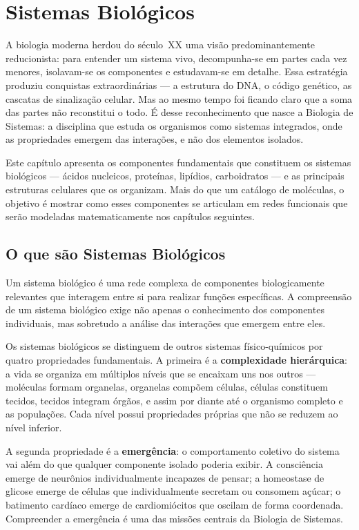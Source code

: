 \chapter{Sistemas Biológicos}
\label{cap:01}

A biologia moderna herdou do século~XX uma visão predominantemente reducionista: para entender
um sistema vivo, decompunha-se em partes cada vez menores, isolavam-se os componentes e
estudavam-se em detalhe. Essa estratégia produziu conquistas extraordinárias --- a estrutura
do DNA, o código genético, as cascatas de sinalização celular. Mas ao mesmo tempo foi ficando
claro que a soma das partes não reconstitui o todo. É desse reconhecimento que nasce a
Biologia de Sistemas: a disciplina que estuda os organismos como sistemas integrados, onde
as propriedades emergem das interações, e não dos elementos isolados.

Este capítulo apresenta os componentes fundamentais que constituem os sistemas biológicos
--- ácidos nucleicos, proteínas, lipídios, carboidratos --- e as principais estruturas
celulares que os organizam. Mais do que um catálogo de moléculas, o objetivo é mostrar
como esses componentes se articulam em redes funcionais que serão modeladas matematicamente
nos capítulos seguintes.

\section{O que são Sistemas Biológicos}

\begin{definicaoenv}
Um sistema biológico é uma rede complexa de componentes biologicamente relevantes que
interagem entre si para realizar funções específicas. A compreensão de um sistema biológico
exige não apenas o conhecimento dos componentes individuais, mas sobretudo a análise das
interações que emergem entre eles.
\end{definicaoenv}

Os sistemas biológicos se distinguem de outros sistemas físico-químicos por quatro
propriedades fundamentais. A primeira é a \textbf{complexidade hierárquica}: a vida se
organiza em múltiplos níveis que se encaixam uns nos outros --- moléculas formam organelas,
organelas compõem células, células constituem tecidos, tecidos integram órgãos, e assim
por diante até o organismo completo e as populações. Cada nível possui propriedades próprias
que não se reduzem ao nível inferior.

A segunda propriedade é a \textbf{emergência}: o comportamento coletivo do sistema vai além
do que qualquer componente isolado poderia exibir. A consciência emerge de neurônios
individualmente incapazes de pensar; a homeostase de glicose emerge de células que
individualmente secretam ou consomem açúcar; o batimento cardíaco emerge de cardiomiócitos
que oscilam de forma coordenada. Compreender a emergência é uma das missões centrais da
Biologia de Sistemas.

